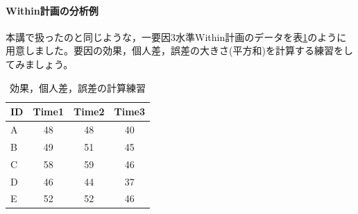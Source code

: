 \documentclass{ltjbook}
\begin{document}
\paragraph{Within計画の分析例}本講で扱ったのと同じような，一要因3水準Within計画のデータを表\ref{m14_example}のように用意しました。要因の効果，個人差，誤差の大きさ(平方和)を計算する練習をしてみましょう。
\begin{table}[ht]
	\centering
	\caption{効果，個人差，誤差の計算練習}
	\begin{tabular}{l|ccc}
		\hline
		ID & Time1 & Time2 & Time3 \\
		\hline
		A  & 48    & 48    & 40    \\
		B  & 49    & 51    & 45    \\
		C  & 58    & 59    & 46    \\
		D  & 46    & 44    & 37    \\
		E  & 52    & 52    & 46    \\
		\hline
	\end{tabular}
	\label{m14_example}
\end{table}
\end{document}

